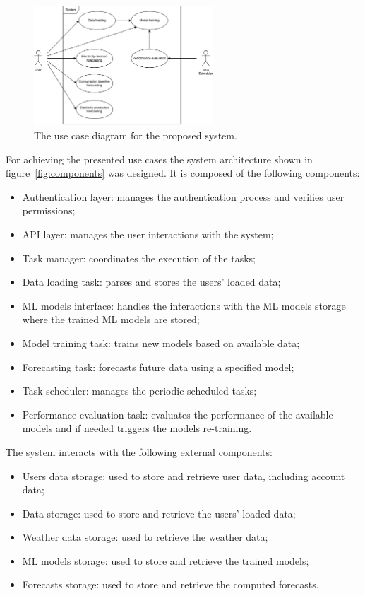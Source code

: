 \begin{figure}[H]
\centering
\includegraphics[width=0.6\textwidth]{images/architecture_use_case}
\caption{The use case diagram for the proposed system.}
\label{fig:usecase}
\end{figure}

For achieving the presented use cases the system architecture shown in figure~\ref{fig:components} was designed.
It is composed of the following components:
\begin{itemize}
  \item Authentication layer: manages the authentication process and verifies user permissions;
  \item API layer: manages the user interactions with the system;
  \item Task manager: coordinates the execution of the tasks;
  \item Data loading task: parses and stores the users' loaded data;
  \item ML models interface: handles the interactions with the ML models storage where the trained ML models are stored;
  \item Model training task: trains new models based on available data;
  \item Forecasting task: forecasts future data using a specified model;
  \item Task scheduler: manages the periodic scheduled tasks;
  \item Performance evaluation task: evaluates the performance of the available models and if needed triggers the models re-training.
\end{itemize}

The system interacts with the following external components:
\begin{itemize}
  \item Users data storage: used to store and retrieve user data, including account data;
  \item Data storage: used to store and retrieve the users' loaded data;
  \item Weather data storage: used to retrieve the weather data;
  \item ML models storage: used to store and retrieve the trained models;
  \item Forecasts storage: used to store and retrieve the computed forecasts.
\end{itemize}

